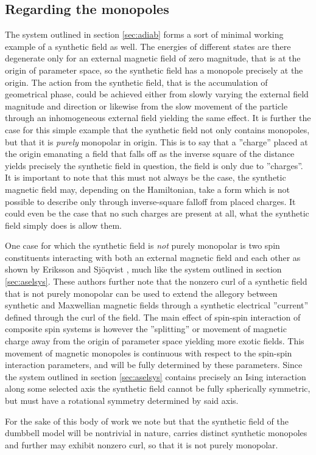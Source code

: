 \documentclass[main.tex]{subfiles}
\begin{document}
\subsection{Regarding the monopoles}\label{sec:regmono}
The system outlined in section \ref{sec:adiab} forms a sort of minimal working example of a
synthetic field as well. The energies of different states are there degenerate only for an
external magnetic field of zero magnitude, that is at the origin of parameter space, so the
synthetic field has a monopole precisely at the origin. The action from the synthetic
field, that is the accumulation of geometrical phase, could be achieved either from slowly
varying the external field magnitude and direction or likewise from the slow movement of the
particle through an inhomogeneous external field yielding the same effect. It is further
the case for this simple example that the synthetic field not only contains monopoles, but
that it is \textit{purely} monopolar in origin. This is to say that a ''charge'' placed at
the origin emanating a field that falls off as the inverse square of the distance yields
precisely the synthetic field in question, the field is only due to
''charges''\cite{berry1984}. It is important to note that this must not
always be the case, the synthetic magnetic field may, depending on the Hamiltonian, take a
form which is not possible to describe only through inverse-square falloff from placed
charges. It could even be the case that no such charges are present at all, what the
synthetic field simply does is allow them. %

One case for which the synthetic field is \textit{not} purely monopolar is two spin
constituents interacting with both an external magnetic field and each other as shown by Eriksson and Sjöqvist
\cite{eriksson}, much like the system outlined in section \ref{sec:aselsys}. These authors further note that the nonzero curl of a synthetic field that is not purely
monopolar can be used to extend the allegory between synthetic and Maxwellian magnetic
fields through a synthetic electrical ''current'' defined through the curl of the field. The main
effect of spin-spin interaction of composite spin systems is however the ''splitting'' or
movement of magnetic charge away from the origin of parameter space yielding more exotic fields. This movement of magnetic monopoles is continuous
with respect to the spin-spin interaction parameters, and will be fully determined by these
parameters. Since the system outlined in section
\ref{sec:aselsys} contains precisely an Ising interaction along some selected axis the
synthetic field cannot be fully spherically symmetric, but must have a rotational symmetry
determined by said axis. 

For the sake of this body of work we note but that the synthetic field of the dumbbell
model will be nontrivial
in nature, carries distinct synthetic monopoles and further may exhibit nonzero curl, so
that it is not purely monopolar.
\end{document}
